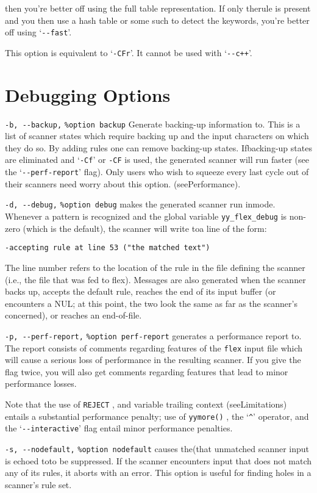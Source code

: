 \documentclass[openany,oneside]{book}
\begin{document}
then you're better off using the full table representation.  If only
therule is present and you then use a hash table or some such
to detect the keywords, you're better off using
‘\verb`--fast`’.

This option is equivalent to ‘\verb`-CFr`’.  It cannot be used
with ‘\verb`--c++`’.
\section{Debugging Options}
\verb`-b, --backup,` \verb`%option backup` Generate backing-up information to.  This is a list of
scanner states which require backing up and the input characters on
which they do so.  By adding rules one can remove backing-up states.  Ifbacking-up states are eliminated and ‘\verb`-Cf`’ or \verb`-CF` is used, the generated scanner will run faster (see the ‘\verb`--perf-report`’ flag). 
Only users who wish to squeeze every last cycle out of their scanners
need worry about this option.  (seePerformance).

\verb`-d, --debug,` \verb`%option debug` makes the generated scanner run inmode.  Whenever a pattern
is recognized and the global variable \verb`yy_flex_debug` is non-zero
(which is the default), the scanner will write toa line
of the form:
\begin{verbatim}
-accepting rule at line 53 ("the matched text")
\end{verbatim}


The line number refers to the location of the rule in the file defining
the scanner (i.e., the file that was fed to flex).  Messages are also
generated when the scanner backs up, accepts the default rule, reaches
the end of its input buffer (or encounters a NUL; at this point, the two
look the same as far as the scanner's concerned), or reaches an
end-of-file.

\verb`-p, --perf-report,` \verb`%option perf-report` generates a performance report to.  The report consists of
comments regarding features of the \verb`flex` input file which will
cause a serious loss of performance in the resulting scanner.  If you
give the flag twice, you will also get comments regarding features that
lead to minor performance losses.

Note that the use of \verb`REJECT` , and
variable trailing context (seeLimitations) entails a substantial
performance penalty; use of \verb`yymore()` , the ‘\verb`^`’ operator, and
the ‘\verb`--interactive`’ flag entail minor performance penalties.

\verb`-s, --nodefault,` \verb`%option nodefault` causes the(that unmatched scanner input is echoed
toto be suppressed.  If the scanner encounters input
that does not match any of its rules, it aborts with an error.  This
option is useful for finding holes in a scanner's rule set.
\end{document}
